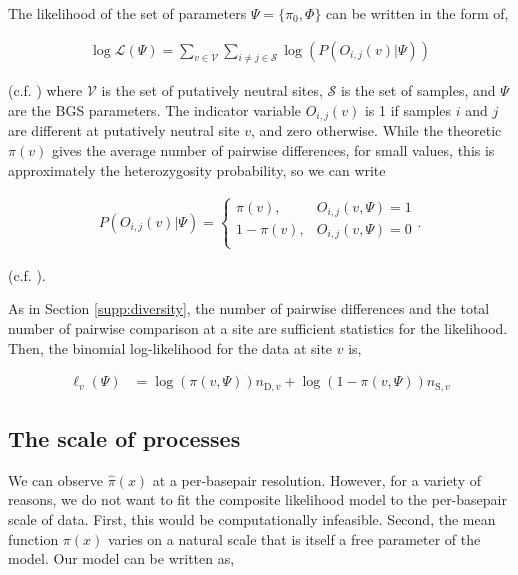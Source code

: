 \documentclass[11pt]{article}
\begin{document}
The likelihood of the set of parameters $\Psi = \{\pi_0, \Phi\}$ can be written
in the form of, 

\begin{align}
  \log\mathcal{L}(\Psi) = \sum_{v \in \mathcal{V}} \sum_{i \ne j \in \mathcal{S}} \log(P(O_{i,j}(v) | \Psi))
\end{align}

(c.f. \cite{McVicker2009-ax,Elyashiv2016-vt,Murphy2022-sj}) where $\mathcal{V}$
is the set of putatively neutral sites, $\mathcal{S}$ is the set of samples,
and $\Psi$ are the BGS parameters. The indicator variable $O_{i,j}(v)$ is 1 if
samples $i$ and $j$ are different at putatively neutral site $v$, and zero
otherwise. While the theoretic $\pi(v)$ gives the average number of pairwise
differences, for small values, this is approximately the heterozygosity
probability, so we can write

\begin{align}
  P(O_{i,j}(v) | \Psi) = 
    \begin{cases}
      \pi(v), & O_{i,j}(v, \Psi) = 1 \\
      1-\pi(v), & O_{i,j}(v, \Psi) = 0 \\
    \end{cases}.
\end{align}

(c.f. \cite{Elyashiv2016-vt}). 

As in Section \ref{supp:diversity}, the number of pairwise differences and
the total number of pairwise comparison at a site are sufficient statistics for
the likelihood. Then, the binomial log-likelihood for the data at site $v$ is,

\begin{align}
  \ell_v(\Psi) &= \log(\pi(v, \Psi)) n_{\text{D},v} + \log(1-\pi(v, \Psi)) n_{\text{S},{v}}
\end{align}

\subsection{The scale of processes}

We can observe $\widehat{\pi}(x)$ at a per-basepair resolution. However, for a
variety of reasons, we do not want to fit the composite likelihood model to the
per-basepair scale of data. First, this would be computationally infeasible.
Second, the mean function $\pi(x)$ varies on a natural scale that is itself a
free parameter of the model. Our model can be written as, 
\end{document}
